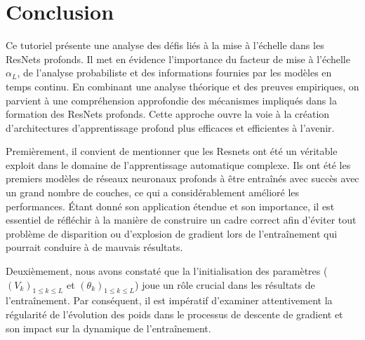 \chapter{Conclusion}
Ce tutoriel présente une analyse des défis liés à la mise à l'échelle dans les ResNets profonds. Il met en évidence l'importance du facteur de mise à l'échelle \(\alpha_L\), de l'analyse probabiliste et des informations fournies par les modèles en temps continu. En combinant une analyse théorique et des preuves empiriques, on parvient à une compréhension approfondie des mécanismes impliqués dans la formation des ResNets profonds. Cette approche ouvre la voie à la création d'architectures d'apprentissage profond plus efficaces et efficientes à l'avenir.

Premièrement, il convient de mentionner que les Resnets ont été un véritable exploit dans le domaine de l'apprentissage automatique complexe. Ils ont été les premiers modèles de réseaux neuronaux profonds à être entraînés avec succès avec un grand nombre de couches, ce qui a considérablement amélioré les performances. Étant donné son application étendue et son importance, il est essentiel de réfléchir à la manière de construire un cadre correct afin d'éviter tout problème de disparition ou d'explosion de gradient lors de l'entraînement qui pourrait conduire à de mauvais résultats.

Deuxièmement, nous avons constaté que la l'initialisation des paramètres ($(V_k)_{1\leqslant k \leqslant L }$ et $(\theta_k)_{1\leqslant k \leqslant L }$) joue un rôle crucial dans les résultats de l'entraînement. Par conséquent, il est impératif d'examiner attentivement la régularité de l'évolution des poids dans le processus de descente de gradient et son impact sur la dynamique de l'entraînement.